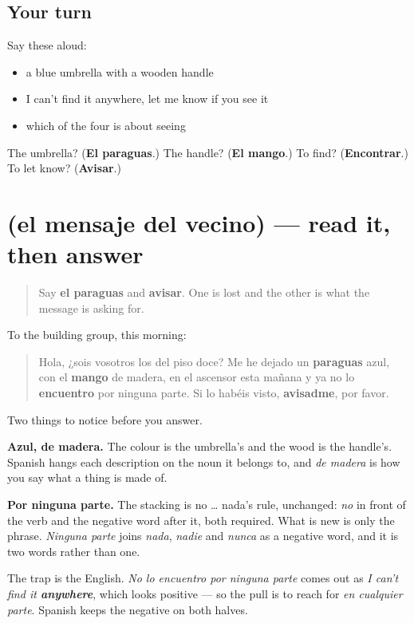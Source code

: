 \subsection*{Your turn}
Say these aloud:

\begin{itemize}
\raggedright
  \item a blue umbrella with a wooden handle
  \item I can't find it anywhere, let me know if you see it
  \item which of the four is about seeing
\end{itemize}

\begin{tcolorbox}[breakable,colback=teal!4,colframe=teal!35!black,title={Before you move on}]
The umbrella? (\textbf{El paraguas}.) The handle? (\textbf{El mango}.) To find? (\textbf{Encontrar}.) To let know? (\textbf{Avisar}.)
\end{tcolorbox}
\section[Practice]{(el mensaje del vecino) — read it, then answer}

\label{lesson:ES-C470-sintesis-paraguas}



\begin{quote}
Say \textbf{el paraguas} and \textbf{avisar}. One is lost and the other is what the message is asking for.
\end{quote}

\begin{tcolorbox}[breakable,skin=enhanced,colback=orange!6,colframe=orange!45!black,boxrule=0.5pt,arc=1mm,left=6pt,right=6pt,top=4pt,bottom=4pt,fonttitle=\bfseries,title={Read this}]
To the building group, this morning:

\begin{quote}
Hola, ¿sois vosotros los del piso doce? Me he dejado un \textbf{paraguas} azul, con el \textbf{mango} de madera, en el ascensor esta mañana y ya no lo \textbf{encuentro} por ninguna parte. Si lo habéis visto, \textbf{avisadme}, por favor.
\end{quote}

Two things to notice before you answer.

\textbf{Azul, de madera.} The colour is the umbrella's and the wood is the handle's. Spanish hangs each description on the noun it belongs to, and \emph{de madera} is how you say what a thing is made of.

\textbf{Por ninguna parte.} The stacking is no … nada's rule, unchanged: \emph{no} in front of the verb and the negative word after it, both required. What is new is only the phrase. \emph{Ninguna parte} joins \emph{nada}, \emph{nadie} and \emph{nunca} as a negative word, and it is two words rather than one.

The trap is the English. \emph{No lo encuentro por ninguna parte} comes out as \emph{I can't find it \textbf{anywhere}}, which looks positive — so the pull is to reach for \emph{en cualquier parte}. Spanish keeps the negative on both halves.
\end{tcolorbox}

